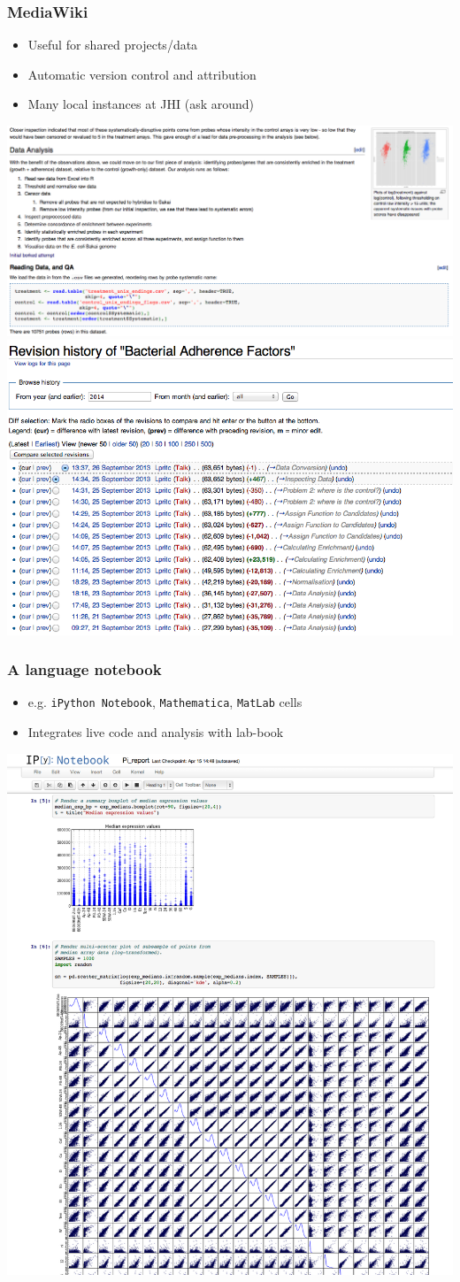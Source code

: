 \begin{frame}
  \frametitle{MediaWiki}
  \begin{itemize}
    \item Useful for shared projects/data
    \item Automatic version control and attribution
    \item Many local instances at JHI (ask around)
  \end{itemize}
  \begin{center}
    \includegraphics[width=.4\textwidth]{images/mediawiki_after}
    \includegraphics[width=.4\textwidth]{images/mediawiki_version_control}     
  \end{center}
\end{frame}
   
\begin{frame}
  \frametitle{A language notebook}
  \begin{itemize}
    \item e.g. \texttt{iPython Notebook}, \texttt{Mathematica}, \texttt{MatLab} cells
    \item Integrates live code and analysis with lab-book
  \end{itemize}
  \begin{center}
    \includegraphics[width=.35\textwidth]{images/ipython_notebook}     
  \end{center}
\end{frame}

